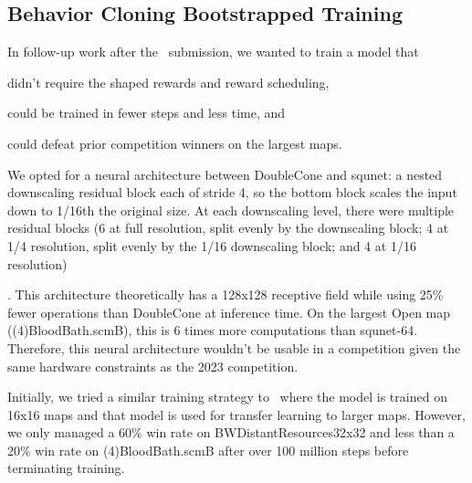 \documentclass[conference]{IEEEtran}
\newif\ifsupplemental
\newcommand{\supptableref}[1]{%
  \ifsupplemental
    \ (Supplemental Table~\ref{#1})%
  \fi
}
\newcommand{\mapname}[1]{#1} %
\newcounter{supptable}
\begin{document}
\subsection{Behavior Cloning Bootstrapped Training}
In follow-up work after the \agentName\ submission, we wanted to train a model that
\begin{inparaenum}[(1)]
    \item didn't require the shaped rewards and reward scheduling,
    \item could be trained in fewer steps and less time, and
    \item could defeat prior competition winners on the largest maps.
\end{inparaenum}
We opted for a neural architecture between DoubleCone and squnet: a nested downscaling residual
block each of stride 4, so the bottom block scales the input down to 1/16th the original
size. At each downscaling level, there were multiple residual blocks (6 at full
resolution, split evenly by the downscaling block; 4 at 1/4 resolution, split evenly by
the 1/16 downscaling block; and 4 at 1/16 resolution)\supptableref{tab:bc-architecture}. This architecture theoretically
has a 128x128 receptive field while using 25\% fewer operations than DoubleCone at inference time. On
the largest Open map (\mapname{(4)BloodBath.scmB}), this is 6 times more
computations than squnet-64. Therefore, this neural architecture wouldn't be usable in a
competition given the same hardware constraints as the 2023 competition.

Initially, we tried a similar training strategy to \agentName\ where the model is
trained on 16x16 maps and that model is used for transfer learning to
larger maps. However, we only managed a 60\% win rate on
\mapname{BWDistantResources32x32} and less than a 20\% win rate on
\mapname{(4)BloodBath.scmB} after over 100 million
steps before terminating training.
\end{document}
